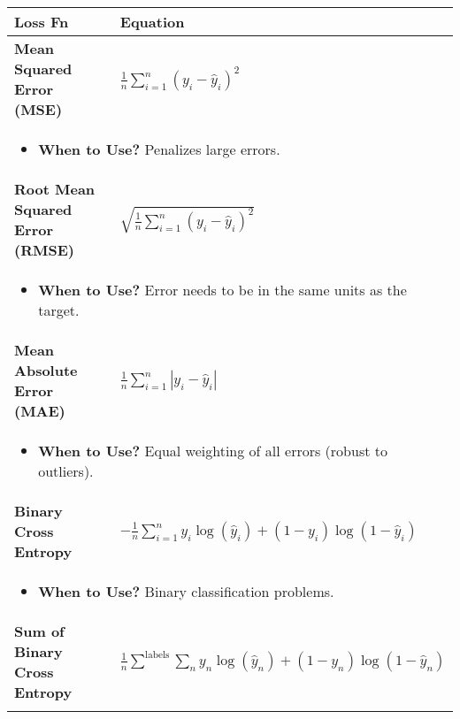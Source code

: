 \documentclass{article}
\begin{document}
\begin{summary}
    \begin{center}
        \begin{tabular}{ll}
            \toprule
            \textbf{Loss Fn} & \textbf{Equation} \\ 
            \toprule
            \textbf{Mean Squared Error (MSE)} & $\frac{1}{n} \sum_{i=1}^{n} (y_i - \hat{y}_i)^2$ \\
            \multicolumn{2}{p{\linewidth}}{
            \begin{itemize}
                \item \textbf{When to Use?} Penalizes large errors.
            \end{itemize}} \\
            \midrule
            \textbf{Root Mean Squared Error (RMSE)} & $\sqrt{\frac{1}{n} \sum_{i=1}^{n} (y_i - \hat{y}_i)^2}$ \\
            \multicolumn{2}{p{\linewidth}}{
            \begin{itemize}
                \item \textbf{When to Use?} Error needs to be in the same units as the target.
            \end{itemize}} \\
            \midrule
            \textbf{Mean Absolute Error (MAE)} & $\frac{1}{n} \sum_{i=1}^{n} |y_i - \hat{y}_i|$ \\
            \multicolumn{2}{p{\linewidth}}{
            \begin{itemize}
                \item \textbf{When to Use?} Equal weighting of all errors (robust to outliers).
            \end{itemize}} \\
            \midrule
            \textbf{Binary Cross Entropy} & $- \frac{1}{n} \sum_{i=1}^{n} y_i \log(\hat{y}_i) + (1 - y_i) \log(1 - \hat{y}_i)$ \\
            \multicolumn{2}{p{\linewidth}}{
            \begin{itemize}
                \item \textbf{When to Use?} Binary classification problems.
            \end{itemize}} \\
            \midrule
            \textbf{Sum of Binary Cross Entropy} & $\frac{1}{n} \sum^{\text{labels}} \sum_n y_n \log(\hat{y}_n) + (1 - y_n) \log(1 - \hat{y}_n)$ \\
            \multicolumn{2}{p{\linewidth}}{
}
\end{tabular}
\end{center}
\end{summary}
\end{document}
